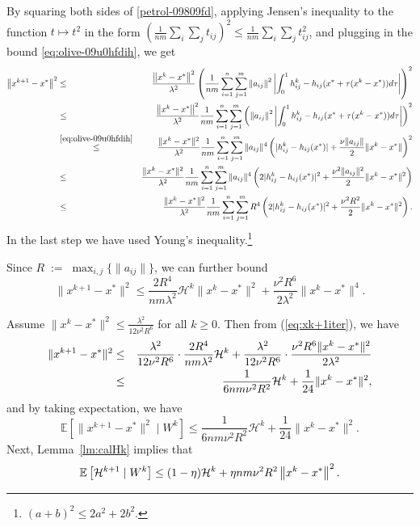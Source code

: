 \documentclass[12pt]{article}
\newcommand{\eqdef}{\; { := }\;}
\newcommand{\ExpBr}[1]{\mathbb{E}\left[#1\right]}
\newcommand{\norm}[1]{\left\|#1\right\|}
\newcommand{\cH}{{\mathcal{H}}}
\begin{document}
By squaring both sides of \eqref{petrol-09809fd},  applying Jensen's inequality to the function $t\mapsto t^2$ in the form $\left(\frac{1}{nm}\sum_i \sum_j t_{ij}\right)^2 \leq \frac{1}{nm}\sum_i \sum_j t^2_{ij}$, and plugging in the bound \eqref{eq:olive-09u0hfdih}, we get
\begin{eqnarray*}	
\norm{ x^{k+1} - x^* }^2	&\overset{}\leq &  \frac{ \norm{x^k - x^*}^2}{ \lambda^2} \left(\frac{1}{nm} \sum_{i=1}^n \sum_{j=1}^{m} \norm{a_{ij}}^2 \left|   \int_{0}^1 h_{ij}^k - h_{ij}(x^* + \tau(x^k - x^*))  d\tau  \right| \right)^2 \\
&\leq &\frac{ \norm{x^k - x^*}^2}{ \lambda^2} \frac{1}{nm} \sum_{i=1}^n \sum_{j=1}^{m} \left( \norm{a_{ij}}^2  \left| \int_{0}^1 h_{ij}^k - h_{ij}(x^* + \tau(x^k - x^*))  d\tau  \right|\right)^2 \\
&\overset{\eqref{eq:olive-09u0hfdih}}{\leq}&  \frac{\|x^k-x^*\|^2}{ \lambda^2} \frac{1}{nm}\sum_{i=1}^n \sum_{j=1}^{m} \|a_{ij}\|^4 \left(   |h_{ij}^k - h_{ij}(x^*)| + \frac{\nu \|a_{ij}\|}{2} \|x^k-x^*\|  \right)^2 \\ 
&\leq&  \frac{\|x^k-x^*\|^2}{ \lambda^2} \frac{1}{nm}\sum_{i=1}^n \sum_{j=1}^{m} \|a_{ij}\|^4 \left(   2|h_{ij}^k - h_{ij}(x^*)|^2 + \frac{\nu^2 \|a_{ij}\|^2}{2} \|x^k-x^*\|^2  \right) \\
&\leq & \frac{\|x^k-x^*\|^2}{ \lambda^2} \frac{1}{nm}\sum_{i=1}^n \sum_{j=1}^{m} R^4 \left(   2|h_{ij}^k - h_{ij}(x^*)|^2 + \frac{\nu^2 R^2}{2} \|x^k-x^*\|^2  \right).
\end{eqnarray*}
In the last step we have used Young's inequality.\footnote{$(a+b)^2 \leq 2a^2 + 2b^2$.}


Since $R\eqdef \max_{i, j} \{ \|a_{ij}\| \}$, we can further bound
\begin{equation}\label{eq:xk+1iter}
\|x^{k+1} - x^*\|^2 \leq \frac{2 R^4}{nm\lambda^2}  \cH^k \|x^k-x^*\|^2 + \frac{ \nu^2 R^6}{2\lambda^2}\|x^k-x^*\|^4. 
\end{equation}


Assume $\|x^k - x^*\|^2 \leq \frac{\lambda^2}{12\nu^2R^6}$ for all $k\geq 0$. Then from (\ref{eq:xk+1iter}), we have 
\begin{eqnarray*}
	\|x^{k+1} - x^*\|^2 &\leq& \frac{\lambda^2}{12\nu^2 R^6} \cdot \frac{2R^4}{nm\lambda^2} \cH^k + \frac{\lambda^2}{12\nu^2 R^6} \cdot \frac{ \nu^2 R^6\|x^k-x^*\|^2}{2\lambda^2} \\ 
	&\leq& \frac{1}{6nm \nu^2 R^2} {\cal H}^k + \frac{1}{24} \|x^k - x^*\|^2, 
\end{eqnarray*}
and by taking expectation, we have 
\begin{equation}\label{eq:expxk+1}
\ExpBr{ \|x^{k+1} - x^*\|^2 \;|\; W^k } \leq  \frac{1}{6nm \nu^2 R^2}  \cH^k + \frac{1}{24} \|x^k - x^*\|^2. 
\end{equation}
Next, Lemma~\ref{lm:calHk} implies that
\begin{equation}\label{eq:oklah090pop}
\ExpBr{ {\cal H}^{k+1} \;|\; W^k} \leq  (1-\eta) {\cal H}^k +  \eta nm \nu^2 R^2 \norm{x^k - x^*}^2.
\end{equation}
\end{document}
